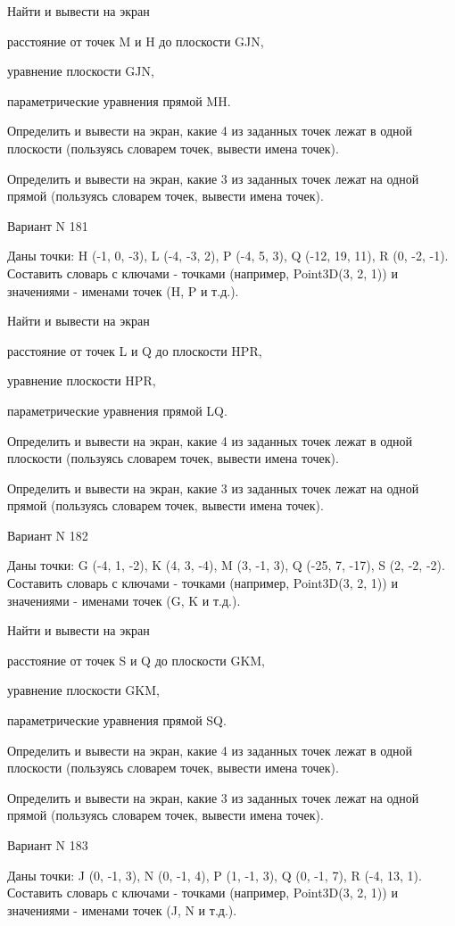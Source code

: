 \documentclass[11pt]{report}
\begin{document}
Найти и вывести на экран


расстояние от точек M и H до плоскости GJN,


уравнение плоскости GJN,


параметрические уравнения прямой MH.


Определить и вывести на экран, какие 4 из заданных точек лежат в одной плоскости (пользуясь словарем точек, вывести имена точек).


Определить и вывести на экран, какие 3 из заданных точек лежат на одной прямой (пользуясь словарем точек, вывести имена точек).

\newpage
Вариант N 181

Даны точки: H (-1, 0, -3), L (-4, -3, 2), P (-4, 5, 3), Q (-12, 19, 11), R (0, -2, -1).
Составить словарь с ключами - точками (например, Point3D(3, 2, 1)) и значениями - именами точек (H, P и т.д.).


Найти и вывести на экран


расстояние от точек L и Q до плоскости HPR,


уравнение плоскости HPR,


параметрические уравнения прямой LQ.


Определить и вывести на экран, какие 4 из заданных точек лежат в одной плоскости (пользуясь словарем точек, вывести имена точек).


Определить и вывести на экран, какие 3 из заданных точек лежат на одной прямой (пользуясь словарем точек, вывести имена точек).

\newpage
Вариант N 182

Даны точки: G (-4, 1, -2), K (4, 3, -4), M (3, -1, 3), Q (-25, 7, -17), S (2, -2, -2).
Составить словарь с ключами - точками (например, Point3D(3, 2, 1)) и значениями - именами точек (G, K и т.д.).


Найти и вывести на экран


расстояние от точек S и Q до плоскости GKM,


уравнение плоскости GKM,


параметрические уравнения прямой SQ.


Определить и вывести на экран, какие 4 из заданных точек лежат в одной плоскости (пользуясь словарем точек, вывести имена точек).


Определить и вывести на экран, какие 3 из заданных точек лежат на одной прямой (пользуясь словарем точек, вывести имена точек).

\newpage
Вариант N 183

Даны точки: J (0, -1, 3), N (0, -1, 4), P (1, -1, 3), Q (0, -1, 7), R (-4, 13, 1).
Составить словарь с ключами - точками (например, Point3D(3, 2, 1)) и значениями - именами точек (J, N и т.д.).
\end{document}
